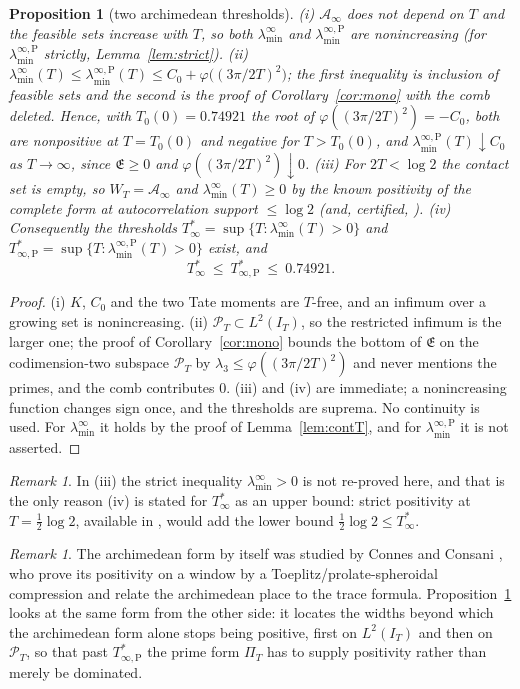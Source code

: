 \documentclass[11pt]{amsart}
\newtheorem{proposition}[theorem]{Proposition}
\theoremstyle{definition}
\theoremstyle{remark}
\newtheorem{remark}[theorem]{Remark}
\newcommand{\PT}{\mathcal P_T}
\newcommand{\IT}{I_T}
\newcommand{\Lev}{\mathfrak E}
\newcommand{\Ainf}{\mathcal A_\infty}
\newcommand{\PiT}{\Pi_T}
\newcommand{\laminf}{\lambda^{\infty}_{\min}}
\newcommand{\laminfP}{\lambda^{\infty,\mathrm P}_{\min}}
\begin{document}
\begin{proposition}[two archimedean thresholds]\label{prop:arch}
\emph{(i)} $\Ainf$ does not depend on $T$ and the feasible sets increase with $T$, so both
$\laminf$ and $\laminfP$ are nonincreasing (for $\laminfP$ strictly, Lemma~\ref{lem:strict}).
\emph{(ii)} $\laminf(T)\le\laminfP(T)\le C_0+\varphi\big((3\pi/2T)^2\big)$; the first inequality is
inclusion of feasible sets and the second is the proof of Corollary~\ref{cor:mono} with the comb deleted. Hence, with
$T_0(0)=0.74921$ the root of $\varphi((3\pi/2T)^2)=-C_0$, both are nonpositive at $T=T_0(0)$ and negative for $T>T_0(0)$, and $\laminfP(T)\downarrow C_0$ as
$T\to\infty$, since $\Lev\ge0$ and $\varphi((3\pi/2T)^2)\downarrow0$.
\emph{(iii)} For $2T<\log2$ the contact set is empty, so $W_T=\Ainf$ and $\laminf(T)\ge0$ by the
known positivity of the complete form at autocorrelation support $\le\log2$
\textup{\cite{Yoshida1992,Bombieri2000}} (and, certified, \cite[Thm.~1.2]{Zhu2026}).
\emph{(iv)} Consequently the thresholds
$T^*_\infty=\sup\{T:\laminf(T)>0\}$ and $T^*_{\infty,\mathrm P}=\sup\{T:\laminfP(T)>0\}$ exist, and
\[
T^*_\infty\ \le\ T^*_{\infty,\mathrm P}\ \le\ 0.74921 .
\]
\end{proposition}
\begin{proof}
(i) $K$, $C_0$ and the two Tate moments are $T$-free, and an infimum over a growing set is
nonincreasing. (ii) $\PT\subset L^2(\IT)$, so the restricted infimum is the larger one; the proof of
Corollary~\ref{cor:mono} bounds the bottom of $\Lev$ on the codimension-two subspace $\PT$ by
$\lambda_3\le\varphi((3\pi/2T)^2)$ and never mentions the primes, and the comb contributes $0$.
(iii) and (iv) are immediate; a nonincreasing function changes sign once, and the thresholds are
suprema. No continuity is used. For $\laminf$ it holds by the proof of Lemma~\ref{lem:contT}, and for
$\laminfP$ it is not asserted.
\end{proof}
\begin{remark}
In (iii) the strict inequality $\laminf>0$ is not re-proved here, and that is the only reason
(iv) is stated for $T^*_\infty$ as an upper bound: strict positivity at $T=\frac12\log2$,
available in \cite{Yoshida1992}, would add the lower bound $\frac12\log2\le T^*_\infty$.
\end{remark}
\begin{remark}
The archimedean form by itself was studied by Connes and Consani \cite{ConnesConsani2021}, who prove
its positivity on a window by a Toeplitz/prolate-spheroidal compression and relate the archimedean
place to the trace formula. Proposition~\ref{prop:arch} looks at the same form from the other side:
it locates the widths beyond which the archimedean form alone stops being positive, first on
$L^2(I_T)$ and then on $\PT$, so that past $T^*_{\infty,\mathrm P}$ the prime form $\PiT$ has to
supply positivity rather than merely be dominated.
\end{remark}
\end{document}

